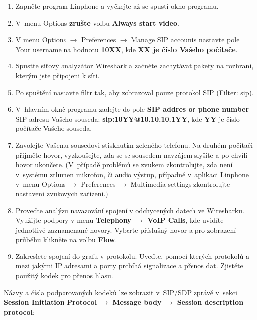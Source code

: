 \begin{enumerate}
    \item Zapněte program Linphone a vyčkejte až se spustí okno programu.
    \item V menu Options {\bf zrušte} volbu {\bf Always start video}.
    \item V menu Options $\rightarrow$ Preferences $\rightarrow$ Manage SIP accounts nastavte pole Your username na hodnotu {\bf 10XX}, kde {\bf XX je číslo Vašeho počítače}.
    \item Spusťte síťový analyzátor Wireshark a začněte zachytávat pakety na rozhraní, kterým jste připojeni k síti.
    \item Po spuštění nastavte filtr tak, aby zobrazoval pouze protokol SIP (Filter: sip).
    \item V hlavním okně programu zadejte do pole {\bf SIP addres or phone number} SIP adresu Vašeho souseda: {\bf sip:10YY@10.10.10.1YY}, kde {\bf YY} je číslo počítače Vašeho souseda.
    \item Zavolejte Vašemu sousedovi stisknutím zeleného telefonu. Na druhém počítači přijměte hovor, vyzkoušejte, zda se se sousedem navzájem slyšíte a po chvíli hovor ukončete.
(V případě problémů se zvukem zkontrolujte, zda není v systému ztlumen mikrofon, či audio výstup, případně v aplikaci Linphone v menu Options $\rightarrow$ Preferences $\rightarrow$ Multimedia settings zkontrolujte nastavení zvukových zařízení.) 
    \item Proveďte analýzu navazování spojení v odchycených datech ve Wiresharku. Využijte podpory v menu {\bf Telephony $\rightarrow$ VoIP Calls}, kde uvidíte jednotlivé zaznamenané hovory. Vyberte příslušný hovor a pro zobrazení průběhu klikněte na volbu {\bf Flow}.
    \item Zakreslete spojení do grafu v protokolu. Uveďte, pomocí kterých protokolů a mezi jakými IP adresami a porty probíhá signalizace a přenos dat. Zjistěte použitý kodek pro přenos hlasu.
\end{enumerate}
Názvy a čísla podporovaných kodeků lze zobrazit v SIP/SDP zprávě v sekci {\bf Session Initiation Protocol} $\rightarrow$ {\bf Message body} $\rightarrow$ {\bf Session description protocol}:
\begin{figure}[h!]
  \centering
\end{figure}

